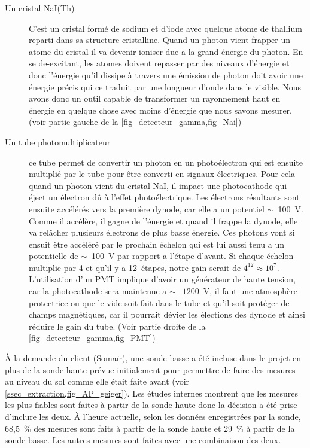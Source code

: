 \begin{description}
    \item[Un cristal NaI(Th)] C'est un cristal formé de sodium et d'iode avec quelque atome de thallium reparti dans sa structure cristalline. Quand un photon vient frapper un atome du cristal il va devenir ioniser due a la grand énergie du photon. En se de-excitant, les atomes doivent repasser par des niveaux d'énergie et donc l'énergie qu'il dissipe à travers une émission de photon doit avoir une énergie précis qui ce traduit par une longueur d'onde dans le visible. Nous avons donc un outil capable de transformer un rayonnement haut en énergie en quelque chose avec moins d'énergie que nous savons mesurer. (voir partie gauche de la \cref{fig_detecteur_gamma,fig_Nai})~\cite{site:explication_NaI}
    \item[Un tube photomultiplicateur]ce tube permet de convertir un photon en un photoélectron qui est ensuite multiplié par le tube pour être converti en signaux électriques. Pour cela quand un photon vient du cristal NaI, il impact une photocathode qui éject un électron dû à l'effet photoélectrique. Les électrons résultants sont ensuite accélérés vers la première dynode, car elle a un potentiel $\sim$~100~V. Comme il accélère, il gagne de l'énergie et quand il frappe la dynode, elle va relâcher plusieurs électrons de plus basse énergie. Ces photons vont si ensuit être accéléré par le prochain échelon qui est lui aussi tenu a un potentielle de $\sim$~100~V par rapport a l'étape d'avant. Si chaque échelon multiplie par 4 et qu'il y a 12~étapes, notre gain serait de $4^{12}\approx10^{7}$. L'utilisation d'un PMT implique d'avoir un générateur de haute tension, car la photocathode sera maintenue a $\sim-1200$~V, il faut une atmosphère protectrice ou que le vide soit fait dans le tube et qu'il soit protéger de champs magnétiques, car il pourrait dévier les élections des dynode et ainsi réduire le gain du tube. (Voir partie droite de la \cref{fig_detecteur_gamma,fig_PMT})~\cite{book:photomultiplier_tube}
\end{description}

À la demande du client (Somaïr), une sonde basse a été incluse dans le projet en plus de la sonde haute prévue initialement pour permettre de faire des mesures au niveau du sol comme elle était faite avant (voir \cref{ssec_extraction,fig_AP_geiger}).
Les études internes montrent que les mesures les plus fiables sont faites à partir de la sonde haute donc la décision a été prise d'inclure les deux. À l'heure actuelle, selon les données enregistrées par la sonde, 68,5~\% des mesures sont faits à partir de la sonde haute et 29~\% à partir de la sonde basse. Les autres mesures sont faites avec une combinaison des deux.%

